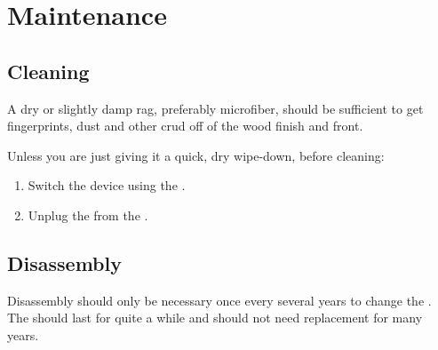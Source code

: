\part{Maintenance} \label{Maintenance}

\chapter{Cleaning} \label{Cleaning}

A dry or slightly damp rag, preferably microfiber, should be sufficient to get
fingerprints, dust and other crud off of the wood finish and \front{} front.

\par\bigskip


\par\bigskip

Unless you are just giving it a quick, dry wipe-down, before cleaning:
\begin{enumerate}
  \item Switch the device  using the \hyperref[Power Switch]{}.
  \item Unplug the \hyperref[Power Adapter]{} from the
    \hyperref[USB Port]{}.
\end{enumerate}

\chapter{Disassembly} \label{Disassembly}

Disassembly should only be necessary once every several years to change the
.  The  should last for quite a while and should not need
replacement for many years.

